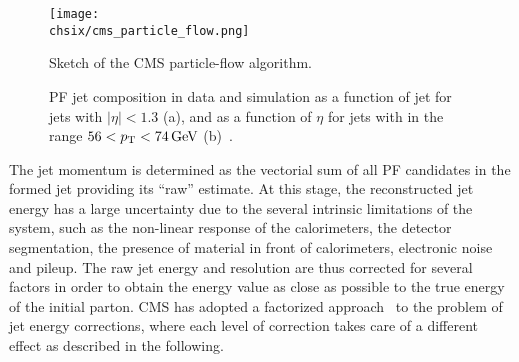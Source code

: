 \begin{figure}[!htb]
 \begin{center}
  \texttt{[image: \\chsix/cms\_particle\_flow.png]}
 \end{center}
 \caption{Sketch of the CMS particle-flow algorithm.}
 \label{fig:PFalgo}
\end{figure}

\begin{figure}[!htb]
\centering
{}
\caption{PF jet composition in data and simulation as a function of jet \pt for jets with $|\eta| < 1.3$ (a), and as a function of $\eta$ for jets with \pt in the range $56 < p_{\mathrm{T}} < 74\,\text{Ge\hspace{-.08em}V}$ (b)~\cite{Khachatryan:2016kdb}.}
\label{fig:PFjet_composition}
\end{figure}

The jet momentum is determined as the vectorial sum of all PF candidates in the formed jet providing its ``raw'' estimate. At this stage, the reconstructed jet energy has a large uncertainty due to the several intrinsic limitations of the system, such as the non-linear response of the calorimeters, the detector segmentation, the presence of material in front of calorimeters, electronic noise and pileup. The raw jet energy and resolution are thus corrected for several factors in order to obtain the energy value as close as possible to the true energy of the initial parton. CMS has adopted a factorized approach~\cite{1748-0221-6-11-P11002} to the problem of jet energy corrections, where each level of correction takes care of a different effect as described in the following.

